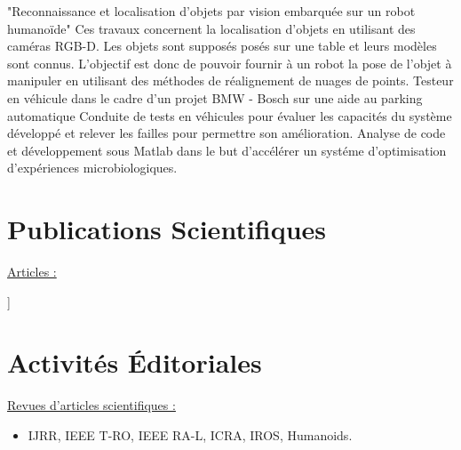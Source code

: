 \documentclass[11pt,a4paper,sans]{moderncv}        %
\newcommand{\items}{\item \hspace{2mm}}
\begin{document}
%
{"Reconnaissance et localisation d'objets par vision embarqu\'ee sur un robot humano\"ide"}{
  Ces travaux concernent la localisation d'objets en utilisant des cam\'eras RGB-D. Les objets sont suppos\'es pos\'es sur une table et leurs mod\`eles sont connus. L'objectif est donc de pouvoir fournir \`a un robot la pose de l'objet \`a manipuler en utilisant des m\'ethodes de r\'ealignement de nuages de points. 
}
%
{Testeur en v\'ehicule dans le cadre d'un projet BMW - Bosch sur une aide au parking automatique}{
  Conduite de tests en v\'ehicules pour \'evaluer les capacit\'es du syst\`eme d\'evelopp\'e et relever les failles pour permettre son am\'elioration.
}
%
{Analyse de code et d\'eveloppement sous Matlab dans le but d'acc\'el\'erer un syst\'eme d'optimisation d'exp\'eriences microbiologiques.
}

\section{Publications Scientifiques}

\toggletrue{myrefs}

\large{\underline{Articles :}}

\begin{itemize}%
\normalsize{\item[[1]\hspace{-2mm}]} \footnotesize{}
\end{itemize}

\newsavebox\mytempbib
\savebox\mytempbib{\parbox{\textwidth}{}}


\section{Activit\'es  \'Editoriales}
\large{\underline{Revues d'articles scientifiques :}}
\begin{itemize}%
\items IJRR, IEEE T-RO, IEEE RA-L, ICRA, IROS, Humanoids.
\end{itemize}
\end{document}

